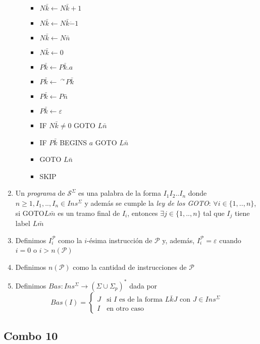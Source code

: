 \documentclass[
]{article}
\providecommand{\tightlist}{%
  \setlength{\itemsep}{0pt}\setlength{\parskip}{0pt}}
\begin{document}
\begin{enumerate}
\begin{itemize}
    \begin{itemize}
    \tightlist
    \item
      \(N\bar{k}\leftarrow N\bar{k}+1\)
    \item
      \(N\bar{k}\leftarrow N\bar{k}\dot{-}1\)
    \item
      \(N\bar{k}\leftarrow N\bar{n}\)
    \item
      \(N\bar{k}\leftarrow 0\)
    \item
      \(P\bar{k}\leftarrow P\bar{k}.a\)
    \item
      \(P\bar{k}\leftarrow\ ^\curvearrowright P\bar{k}\)
    \item
      \(P\bar{k}\leftarrow P\bar{n}\)
    \item
      \(P\bar{k}\leftarrow\varepsilon\)
    \item
      IF \(N\bar{k}\neq 0\) GOTO \(L\bar{n}\)
    \item
      IF \(P\bar{k}\) BEGINS \(a\) GOTO \(L\bar{n}\)
    \item
      GOTO \(L\bar{n}\)
    \item
      SKIP
    \end{itemize}
  \end{itemize}
\item
  Un \emph{programa} de \(\mathcal{S}^\Sigma\) es una palabra de la
  forma \(I_1I_2..I_n\) donde \(n\geq 1,I_1,..,I_n\in Ins^\Sigma\) y
  además se cumple la \emph{ley de los GOTO}:
  \(\forall i\in\{1,..,n\}\), si GOTO\(L\bar{m}\) es un tramo final de
  \(I_i\), entonces \(\exists j\in\{1,..,n\}\) tal que \(I_j\) tiene
  label \(L\bar{m}\)
\item
  Definimos \(I_i^\mathcal{P}\) como la \(i\)-ésima instrucción de
  \(\mathcal{P}\) y, además, \(I_i^\mathcal{P}=\varepsilon\) cuando
  \(i=0\) o \(i>n(\mathcal{P})\)
\item
  Definimos \(n(\mathcal{P})\) como la cantidad de instrucciones de
  \(\mathcal{P}\)
\item
  Definimos \(Bas:Ins^\Sigma\to(\Sigma\cup\Sigma_p)^*\) dada por
  \[Bas(I)=\begin{cases} J & \text{si }I\text{ es de la forma }L\bar{k}J\text{ con }J\in Ins^\Sigma\\ I & \text{en otro caso} \end{cases}\]
\end{enumerate}

\subsection{Combo 10}\label{combo-10}
\end{document}
